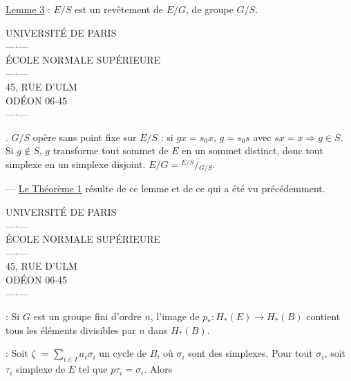 \uline{Lemme 3} : $E/S$ est un revêtement  de $E/G$, de groupe $G/S$.



\begin{center}
UNIVERSITÉ DE PARIS\\
---$\cdot$---\\
ÉCOLE NORMALE SUPÉRIEURE\\
---$\cdot$---\\
45, RUE D'ULM\\
ODÉON 06$\cdot$45\\
---$\cdot$---
\end{center}

. $G/S$ opère sans point fixe sur $E/S$ : si $gx=s_0x$, $g=s_0s$ avec $sx=x\Rightarrow g\in S$. Si $g\notin S$, $g$ transforme tout sommet de $E$ en un sommet distinct, donc tout simplexe en un simplexe disjoint. $E/G={}^{E/S}\!/\!{}_{G/S}$.

--- \uline{Le Théorème 1}  résulte de ce lemme et de ce qui a été vu précédemment.




\begin{center}
UNIVERSITÉ DE PARIS\\
---$\cdot$---\\
ÉCOLE NORMALE SUPÉRIEURE\\
---$\cdot$---\\
45, RUE D'ULM\\
ODÉON 06$\cdot$45\\
---$\cdot$---
\end{center}


 : Si $G$ est un groupe fini d'ordre $n$, l'image de $p_*:H_*(E)\longrightarrow H_*(B)$ contient tous les éléments  divisibles par $n$ dans $H_*(B)$.

 : Soit $\zeta$  $=\sum_{i\in I}a_i\sigma_i$ un cycle de $B$, où $\sigma_i$ sont des simplexes. Pour tout $\sigma_i$, soit $\tau_i$ simplexe de $E$ tel que $p\tau_i=\sigma_i$. Alors

